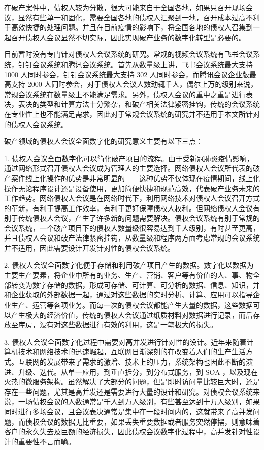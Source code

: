 在破产案件中，债权人较为分散，很大可能来自于全国各地，如果只召开现场会议，显然有些单一和固化，需要全国各地的债权人汇聚到一地，召开成本过高不利于高效快捷的处理问题。并且在目前疫情的影响下，将全国各地的债权人召集到一起召开债权人会议显然不切实际，因此实现破产业务的数字化转型是必要的。

目前暂时没有专门针对债权人会议系统的研究。常规的视频会议系统有飞书会议系统，钉钉会议系统和腾讯会议系统。首先从数量级上讲，飞书会议系统最大支持 1000 人同时参会，钉钉会议系统最大支持 302 人同时参会，而腾讯会议企业版最高支持 2000 人同时参会，对于债权人会议人数动辄千人，偶尔上万的级别来说，常规会议系统在数量级上不能满足需求。另外，债权人会议的重中之重是进行表决，表决的类型和计算方法十分繁杂，和破产相关法律紧密挂钩，传统的会议系统在专业性上也不能满足需求，因此对于常规会议系统的研究并不适用于本文所针对的债权人会议系统。

破产领域的债权人会议全面数字化的研究意义主要有以下三点：

1. 债权人会议全面数字化可以简化破产项目的流程。由于受新冠肺炎疫情影响，通过网络形式召开债权人会议成为管理人的主要选择。网络债权人会议所代表的破产案件线上化操作的优势是非常明显的——这种优势不仅体现在疫情期间，线上化操作无论程序设计还是设备使用，更加简便快捷和规范高效，代表破产业务未来的工作趋势。网络债权人会议是在网络时代下，利用网络技术对债权人会议召开方式的革新，有利于提高工作效率，有利于更好保障债权人权利。但网络债权人会议有别于传统债权人会议，产生了许多新的问题需要解决。债权会议系统有别于常规的会议系统，一个破产项目下的债权人数量级很容易达到千人级别，有时甚至更高，并且债权人会议和破产法律紧密挂钩，从数量级和程序两方面考虑常规的会议系统并不适用，因此需要设计开发针对性的债权会议系统。

2. 债权人会议全面数字化便于存储和利用破产项目产生的数据。数字化以数据为主要生产要素，将企业中所有的业务、生产、营销、客户等有价值的人、事、物全部转变为数字存储的数据，形成可存储、可计算、可分析的数据、信息、知识，并和企业获取的外部数据一起，通过对这些数据的实时分析、计算、应用可以指导企业生产、运营等各项业务。而每一次的债权会议都能产生大量的数据，这些数据可以产生极大的经济价值，传统的债权人会议通过纸质材料对数据进行记录，而后存放至库房，没有对这些数据进行有效的利用，这是一笔极大的损失。

3. 债权人会议全面数字化过程中需要对高并发进行针对性的设计。近年来随着计算机技术和网络技术的迅速崛起，互联网日渐深刻的在改变着人们的生产生活方式。互联网的发展带来了需求的激增、技术上的压力，系统架构也因此不断的演进、升级、迭代。从单一应用，到垂直拆分，到分布式服务，到 SOA ，以及现在火热的微服务架构。虽然解决了大部分的问题，但是即时访问量比较巨大时，还是存在一些问题，尤其是高并发还是需要进行大量的设计和研究。对债权会议系统来说，一场债权会议的人数通常是千人到万人级别，有些甚至达到十万人级别，如果同时进行多场会议，且会议表决通常是集中在一段时间内的，这就带来了高并发问题，而债权会议的数据无比重要，如果丢失重要数据或者服务突然停摆，则意味着客户的永久失去及巨额的经济损失，因此债权会议数字化过程中，高并发针对性设计的重要性不言而喻。

